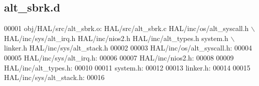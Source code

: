 \subsection{alt\+\_\+sbrk.\+d}
\label{alt__sbrk_8d_source}

\begin{DoxyCode}
00001 obj/HAL/src/alt\_sbrk.o: HAL/src/alt\_sbrk.c HAL/inc/os/alt\_syscall.h \(\backslash\)
 HAL/inc/sys/alt_irq.h HAL/inc/nios2.h HAL/inc/alt\_types.h system.h \(\backslash\)
 linker.h HAL/inc/sys/alt\_stack.h
00002 
00003 HAL/inc/os/alt\_syscall.h:
00004 
00005 HAL/inc/sys/alt_irq.h:
00006 
00007 HAL/inc/nios2.h:
00008 
00009 HAL/inc/alt\_types.h:
00010 
00011 system.h:
00012 
00013 linker.h:
00014 
00015 HAL/inc/sys/alt\_stack.h:
00016 \end{DoxyCode}

